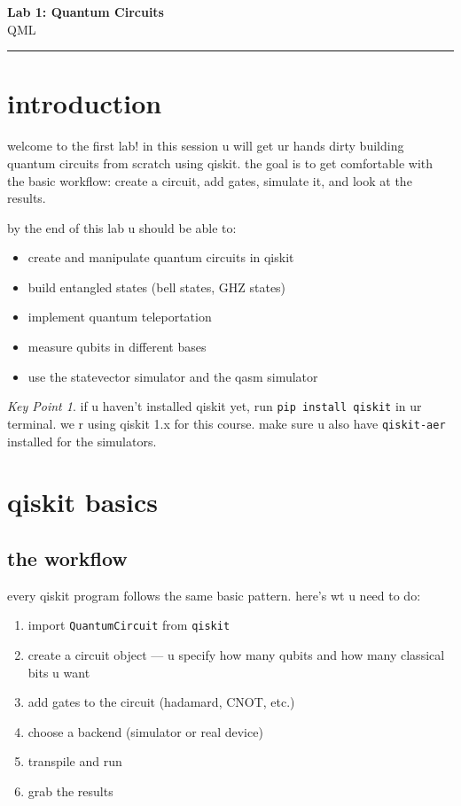 \documentclass[11pt,a4paper]{article}
\theoremstyle{definition}
\theoremstyle{remark}
\newtheorem*{keypoint}{Key Point}
\begin{document}
{\LARGE \textbf{Lab 1: Quantum Circuits}}\\[8pt]
{\large QML}\\[12pt]
\hrule

\vspace{16pt}

\section{introduction}

welcome to the first lab! in this session u will get ur hands dirty building quantum circuits from scratch using qiskit. the goal is to get comfortable with the basic workflow: create a circuit, add gates, simulate it, and look at the results.

by the end of this lab u should be able to:
\begin{itemize}[leftmargin=*]
  \item create and manipulate quantum circuits in qiskit
  \item build entangled states (bell states, GHZ states)
  \item implement quantum teleportation
  \item measure qubits in different bases
  \item use the statevector simulator and the qasm simulator
\end{itemize}

\begin{keypoint}
if u haven't installed qiskit yet, run \texttt{pip install qiskit} in ur terminal. we r using qiskit 1.x for this course. make sure u also have \texttt{qiskit-aer} installed for the simulators.
\end{keypoint}

\section{qiskit basics}

\subsection{the workflow}

every qiskit program follows the same basic pattern. here's wt u need to do:

\begin{enumerate}[leftmargin=*]
  \item import \texttt{QuantumCircuit} from \texttt{qiskit}
  \item create a circuit object --- u specify how many qubits and how many classical bits u want
  \item add gates to the circuit (hadamard, CNOT, etc.)
  \item choose a backend (simulator or real device)
  \item transpile and run
  \item grab the results
\end{enumerate}
\end{document}
